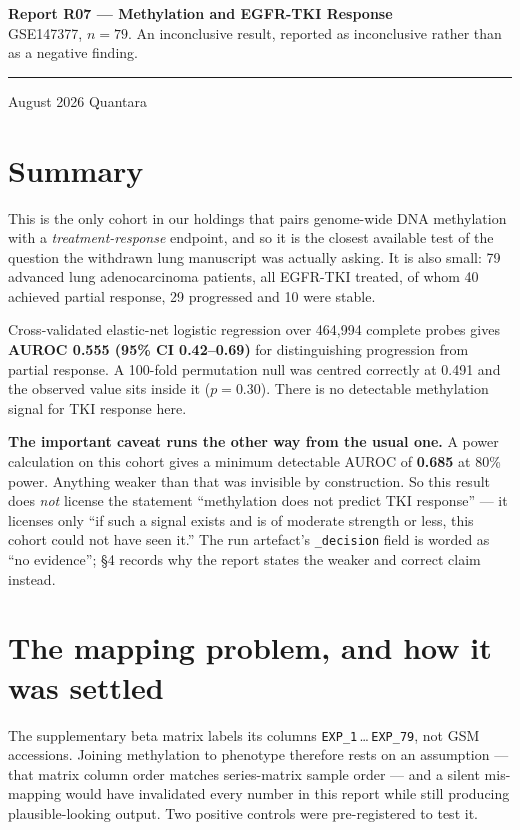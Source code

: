 \documentclass[11pt,a4paper]{article}
\begin{document}
\thispagestyle{empty}
\noindent
{\large\bfseries\color{qnavy} Report R07 --- Methylation and EGFR-TKI Response}\\[2pt]
{\color{qgrey}GSE147377, $n=79$. An inconclusive result, reported as inconclusive rather than
as a negative finding.}\\[6pt]
{\color{qgrey}\rule{\textwidth}{0.4pt}}

\medskip
{} August 2026 \quad\textbullet\quad Quantara

\section*{Summary}

This is the only cohort in our holdings that pairs genome-wide DNA methylation with a
\emph{treatment-response} endpoint, and so it is the closest available test of the question the
withdrawn lung manuscript was actually asking. It is also small: 79 advanced lung
adenocarcinoma patients, all EGFR-TKI treated, of whom 40 achieved partial response, 29
progressed and 10 were stable.

Cross-validated elastic-net logistic regression over 464{,}994 complete probes gives
\textbf{AUROC 0.555 (95\% CI 0.42--0.69)} for distinguishing progression from partial response.
A 100-fold permutation null was centred correctly at 0.491 and the observed value sits inside
it ($p=0.30$). There is no detectable methylation signal for TKI response here.

\textbf{The important caveat runs the other way from the usual one.} A power calculation on
this cohort gives a minimum detectable AUROC of \textbf{0.685} at 80\% power. Anything weaker
than that was invisible by construction. So this result does \emph{not} license the statement
``methylation does not predict TKI response'' --- it licenses only ``if such a signal exists
and is of moderate strength or less, this cohort could not have seen it.'' The run artefact's
\texttt{\_decision} field is worded as ``no evidence''; \S4 records why the report states the
weaker and correct claim instead.

\section{The mapping problem, and how it was settled}

The supplementary beta matrix labels its columns \texttt{EXP\_1}\,\ldots\,\texttt{EXP\_79}, not
GSM accessions. Joining methylation to phenotype therefore rests on an assumption --- that
matrix column order matches series-matrix sample order --- and a silent mis-mapping would have
invalidated every number in this report while still producing plausible-looking output. Two
positive controls were pre-registered to test it.
\end{document}
